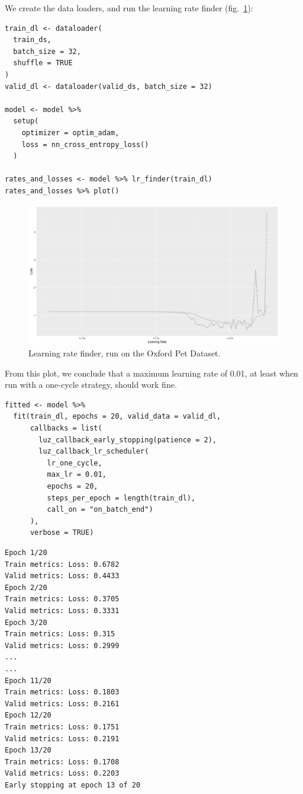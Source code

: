 \documentclass[
  letterpaper,
]{krantz}
\begin{document}
We create the data loaders, and run the learning rate finder
(fig.~\ref{fig-segmentation-lr-finder}):

\begin{verbatim}
train_dl <- dataloader(
  train_ds,
  batch_size = 32,
  shuffle = TRUE
)
valid_dl <- dataloader(valid_ds, batch_size = 32)

model <- model %>%
  setup(
    optimizer = optim_adam,
    loss = nn_cross_entropy_loss()
  )

rates_and_losses <- model %>% lr_finder(train_dl)
rates_and_losses %>% plot()
\end{verbatim}

\begin{figure}[H]

{\centering \includegraphics{images/segmentation-lr-finder.png}

}

\caption{\label{fig-segmentation-lr-finder}Learning rate finder, run on
the Oxford Pet Dataset.}

\end{figure}

From this plot, we conclude that a maximum learning rate of 0.01, at
least when run with a one-cycle strategy, should work fine.

\begin{verbatim}
fitted <- model %>%
  fit(train_dl, epochs = 20, valid_data = valid_dl,
      callbacks = list(
        luz_callback_early_stopping(patience = 2),
        luz_callback_lr_scheduler(
          lr_one_cycle,
          max_lr = 0.01,
          epochs = 20,
          steps_per_epoch = length(train_dl),
          call_on = "on_batch_end")
      ),
      verbose = TRUE)
\end{verbatim}

\begin{verbatim}
Epoch 1/20
Train metrics: Loss: 0.6782                                               
Valid metrics: Loss: 0.4433
Epoch 2/20
Train metrics: Loss: 0.3705
Valid metrics: Loss: 0.3331
Epoch 3/20
Train metrics: Loss: 0.315
Valid metrics: Loss: 0.2999
...
...
Epoch 11/20
Train metrics: Loss: 0.1803
Valid metrics: Loss: 0.2161
Epoch 12/20
Train metrics: Loss: 0.1751
Valid metrics: Loss: 0.2191
Epoch 13/20
Train metrics: Loss: 0.1708
Valid metrics: Loss: 0.2203
Early stopping at epoch 13 of 20
\end{verbatim}
\end{document}
